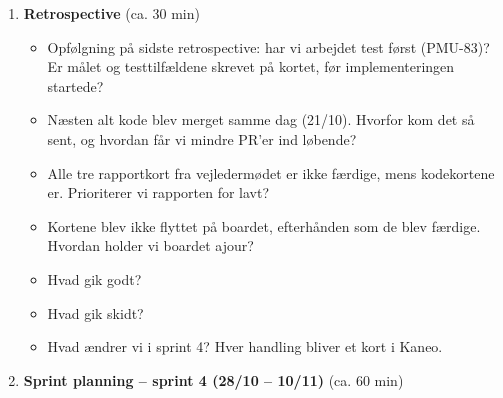 \documentclass[a4paper,11pt]{article}
\begin{document}
\begin{enumerate}
    \begin{figure}[H]
        \centering
        \velocitytable
        \caption{Velocity pr. sprint. Sprint 3 var tre uger med efterårsferie. Det, der ikke blev færdigt, er de tre rapportkort om flows og Keycloak.}
        \label{fig:velocity}
    \end{figure}
    \item \textbf{Retrospective} (ca. 30 min)
    \begin{itemize}
        \item Opfølgning på sidste retrospective: har vi arbejdet test først (PMU-83)? Er målet og testtilfældene skrevet på kortet, før implementeringen startede?
        \item Næsten alt kode blev merget samme dag (21/10). Hvorfor kom det så sent, og hvordan får vi mindre PR'er ind løbende?
        \item Alle tre rapportkort fra vejledermødet er ikke færdige, mens kodekortene er. Prioriterer vi rapporten for lavt?
        \item Kortene blev ikke flyttet på boardet, efterhånden som de blev færdige. Hvordan holder vi boardet ajour?
        \item Hvad gik godt?
        \item Hvad gik skidt?
        \item Hvad ændrer vi i sprint 4? Hver handling bliver et kort i Kaneo.
    \end{itemize}
    \item \textbf{Sprint planning -- sprint 4 (28/10 -- 10/11)} (ca. 60 min)
    \begin{itemize}

\end{itemize}
\end{enumerate}
\end{document}
